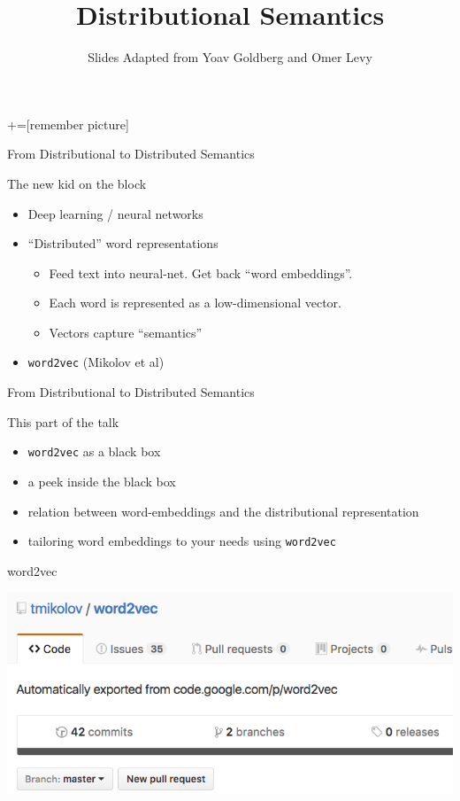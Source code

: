\documentclass[compress]{beamer}
\title{Distributional Semantics}
\date{Slides Adapted from Yoav Goldberg and Omer Levy}
\begin{document}
+=[remember picture]



\begin{frame}
  \titlepage
\end{frame}


\begin{frame}{From Distributional to Distributed Semantics}
    \begin{block}{The new kid on the block}
        \begin{itemize}
            \item Deep learning / neural networks
            \item ``Distributed'' word representations
                \begin{itemize}
                    \item Feed text into neural-net. Get back ``word
                        embeddings''.
                    \item Each word is represented as a low-dimensional vector.
                    \item Vectors capture ``semantics''
                \end{itemize}
            \item \texttt{word2vec} (Mikolov et al)
        \end{itemize}
    \end{block}
\end{frame}

\begin{frame}{From Distributional to Distributed Semantics}
    \begin{block}{This part of the talk}
        \begin{itemize}
            \item \texttt{word2vec} as a black box
            \item a peek inside the black box
            \item relation between word-embeddings and the distributional
                representation
            \item tailoring word embeddings to your needs using
                \texttt{word2vec}
        \end{itemize}
    \end{block}
\end{frame}

\begin{frame}{word2vec}

    \includegraphics[width=\textwidth]{distsim/word2vec_site}

\end{frame}
\end{document}
